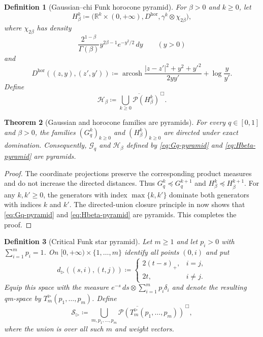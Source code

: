\documentclass[10pt,a4paper]{amsart}
\numberwithin{equation}{section}
\newtheorem{theorem}{Theorem}[section]
\newtheorem{definition}[theorem]{Definition}
\newcommand{\R}{\mathbb R}
\newcommand{\Pyr}{\mathcal P}
\DeclareMathOperator{\arcosh}{arcosh}
\begin{document}
\begin{definition}[Gaussian--chi Funk horocone pyramid]\label{def:horocone}
For $\beta>0$ and $k\ge0$, let
\[ H_\beta^k\coloneqq\bigl(\R^k\times(0,+\infty),D^{\mathrm{hor}},\gamma^k\otimes\chi_{2\beta}\bigr), \]
where $\chi_{2\beta}$ has density
\[ \frac{2^{1-\beta}}{\Gamma(\beta)}y^{2\beta-1}e^{-y^2/2}\,dy \qquad(y>0) \]
and
\begin{equation}\label{eq:horocone-distance} D^{\mathrm{hor}}((z,y),(z',y'))\coloneqq\arcosh\frac{|z-z'|^2+y^2+y'^2}{2yy'}+\log\frac{y}{y'}. \end{equation}
Define
\begin{equation}\label{eq:Hbeta-pyramid} \mathcal H_\beta\coloneqq\overline{\bigcup_{k\ge0}\Pyr(H_\beta^k)}^{\,\Box}. \end{equation}
\end{definition}

\begin{theorem}[Gaussian and horocone families are pyramids]\label{thm:gaussian-horocone-pyramids}
For every $q\in[0,1]$ and $\beta>0$, the families $(G_q^k)_{k\ge0}$ and $(H_\beta^k)_{k\ge0}$ are directed under exact domination.  Consequently, $\mathcal G_q$ and $\mathcal H_\beta$ defined by \eqref{eq:Gq-pyramid} and \eqref{eq:Hbeta-pyramid} are pyramids.
\end{theorem}

\begin{proof}
The coordinate projections preserve the corresponding product measures and do not increase the directed distances.  Thus $G_q^k\preceq G_q^{k+1}$ and $H_\beta^k\preceq H_\beta^{k+1}$.  For any $k,k'\ge0$, the generators with index $\max\{k,k'\}$ dominate both generators with indices $k$ and $k'$.  The directed-union closure principle in  now shows that \eqref{eq:Gq-pyramid} and \eqref{eq:Hbeta-pyramid} are pyramids.
This completes the proof.
\end{proof}

\begin{definition}[Critical Funk star pyramid]\label{def:critical-star}
Let $m\ge1$ and let $p_i>0$ with $\sum_{i=1}^mp_i=1$.  On $[0,+\infty)\times\{1,\ldots,m\}$ identify all points $(0,i)$ and put
\begin{equation}\label{eq:critical-star-distance} d_{\rhd}((s,i),(t,j))\coloneqq\begin{cases}2(t-s)_+,&i=j,\\2t,&i\ne j.\end{cases} \end{equation}
Equip this space with the measure $e^{-s}\,ds\otimes\sum_{i=1}^mp_i\delta_i$ and denote the resulting qm-space by $T_m^{\rhd}(p_1,\ldots,p_m)$.  Define
\begin{equation}\label{eq:critical-star-pyramid} \mathcal S_{\rhd}\coloneqq\overline{\bigcup_{m,p_1,\ldots,p_m}\Pyr(T_m^{\rhd}(p_1,\ldots,p_m))}^{\,\Box}, \end{equation}
where the union is over all such $m$ and weight vectors.
\end{definition}
\end{document}
